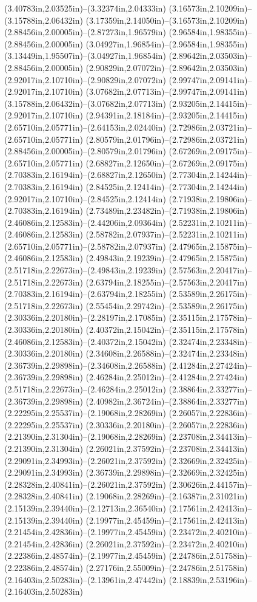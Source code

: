 (3.40783in,2.03525in)--(3.32374in,2.04333in) (3.16573in,2.10209in)--(3.15788in,2.06432in) (3.17359in,2.14050in)--(3.16573in,2.10209in) (2.88456in,2.00005in)--(2.87273in,1.96579in) (2.96584in,1.98355in)--(2.88456in,2.00005in) (3.04927in,1.96854in)--(2.96584in,1.98355in) (3.13449in,1.95507in)--(3.04927in,1.96854in) (2.89642in,2.03503in)--(2.88456in,2.00005in) (2.90829in,2.07072in)--(2.89642in,2.03503in) (2.92017in,2.10710in)--(2.90829in,2.07072in) (2.99747in,2.09141in)--(2.92017in,2.10710in) (3.07682in,2.07713in)--(2.99747in,2.09141in) (3.15788in,2.06432in)--(3.07682in,2.07713in) (2.93205in,2.14415in)--(2.92017in,2.10710in) (2.94391in,2.18184in)--(2.93205in,2.14415in) (2.65710in,2.05771in)--(2.64153in,2.02440in) (2.72986in,2.03721in)--(2.65710in,2.05771in) (2.80579in,2.01796in)--(2.72986in,2.03721in) (2.88456in,2.00005in)--(2.80579in,2.01796in) (2.67269in,2.09175in)--(2.65710in,2.05771in) (2.68827in,2.12650in)--(2.67269in,2.09175in) (2.70383in,2.16194in)--(2.68827in,2.12650in) (2.77304in,2.14244in)--(2.70383in,2.16194in) (2.84525in,2.12414in)--(2.77304in,2.14244in) (2.92017in,2.10710in)--(2.84525in,2.12414in) (2.71938in,2.19806in)--(2.70383in,2.16194in) (2.73489in,2.23482in)--(2.71938in,2.19806in) (2.46086in,2.12583in)--(2.44206in,2.09364in) (2.52231in,2.10211in)--(2.46086in,2.12583in) (2.58782in,2.07937in)--(2.52231in,2.10211in) (2.65710in,2.05771in)--(2.58782in,2.07937in) (2.47965in,2.15875in)--(2.46086in,2.12583in) (2.49843in,2.19239in)--(2.47965in,2.15875in) (2.51718in,2.22673in)--(2.49843in,2.19239in) (2.57563in,2.20417in)--(2.51718in,2.22673in) (2.63794in,2.18255in)--(2.57563in,2.20417in) (2.70383in,2.16194in)--(2.63794in,2.18255in) (2.53589in,2.26175in)--(2.51718in,2.22673in) (2.55454in,2.29742in)--(2.53589in,2.26175in) (2.30336in,2.20180in)--(2.28197in,2.17085in) (2.35115in,2.17578in)--(2.30336in,2.20180in) (2.40372in,2.15042in)--(2.35115in,2.17578in) (2.46086in,2.12583in)--(2.40372in,2.15042in) (2.32474in,2.23348in)--(2.30336in,2.20180in) (2.34608in,2.26588in)--(2.32474in,2.23348in) (2.36739in,2.29898in)--(2.34608in,2.26588in) (2.41284in,2.27424in)--(2.36739in,2.29898in) (2.46284in,2.25012in)--(2.41284in,2.27424in) (2.51718in,2.22673in)--(2.46284in,2.25012in) (2.38864in,2.33277in)--(2.36739in,2.29898in) (2.40982in,2.36724in)--(2.38864in,2.33277in) (2.22295in,2.25537in)--(2.19068in,2.28269in) (2.26057in,2.22836in)--(2.22295in,2.25537in) (2.30336in,2.20180in)--(2.26057in,2.22836in) (2.21390in,2.31304in)--(2.19068in,2.28269in) (2.23708in,2.34413in)--(2.21390in,2.31304in) (2.26021in,2.37592in)--(2.23708in,2.34413in) (2.29091in,2.34993in)--(2.26021in,2.37592in) (2.32669in,2.32425in)--(2.29091in,2.34993in) (2.36739in,2.29898in)--(2.32669in,2.32425in) (2.28328in,2.40841in)--(2.26021in,2.37592in) (2.30626in,2.44157in)--(2.28328in,2.40841in) (2.19068in,2.28269in)--(2.16387in,2.31021in) (2.15139in,2.39440in)--(2.12713in,2.36540in) (2.17561in,2.42413in)--(2.15139in,2.39440in) (2.19977in,2.45459in)--(2.17561in,2.42413in) (2.21454in,2.42836in)--(2.19977in,2.45459in) (2.23472in,2.40210in)--(2.21454in,2.42836in) (2.26021in,2.37592in)--(2.23472in,2.40210in) (2.22386in,2.48574in)--(2.19977in,2.45459in) (2.24786in,2.51758in)--(2.22386in,2.48574in) (2.27176in,2.55009in)--(2.24786in,2.51758in) (2.16403in,2.50283in)--(2.13961in,2.47442in) (2.18839in,2.53196in)--(2.16403in,2.50283in) 